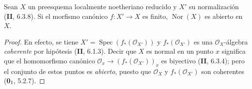 \begin{proposition}[6.13.2]
\label{IV.2.s6.13.2-fr}
Sean $X$ un preesquema localmente noetheriano reducido y $X'$ su
normalización \textup{(\textbf{II}, 6.3.8)}. Si el morfismo canónico $f:X'\to X$ es finito,
$\operatorname{Nor}(X)$ es abierto en $X$.
\end{proposition}

\begin{proof}
En efecto, se tiene $X'=\operatorname{Spec}(f_*(\mathcal O_{X'}))$ y
$f_*(\mathcal O_{X'})$ es una $\mathcal O_X$-álgebra \emph{coherente} por
hipótesis (\textbf{II}, 6.1.3). Decir que $X$ es normal en un punto $x$ significa
que el homomorfismo canónico
$\mathcal O_x\to(f_*(\mathcal O_{X'}))_x$ es biyectivo (\textbf{II}, 6.3.4);
pero el conjunto de estos puntos es \emph{abierto}, puesto que $\mathcal O_X$
y $f_*(\mathcal O_{X'})$ son coherentes (\textbf{0}$_{\rm I}$, 5.2.7).
\end{proof}
